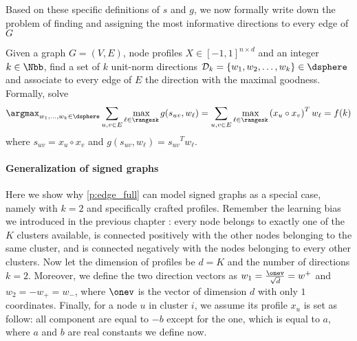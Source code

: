 Based on these specific definitions of $s$ and $g$, we now formally write down the problem of
finding and assigning the most informative directions to every edge of $G$
\begin{problem}[]
  \label{p:edge_full}
  Given a graph $G=(V, E)$, node profiles $X\in [-1, 1]^{n\times d}$ and an integer $k \in \Nbb$,
  find a set of $k$ unit-norm directions $\mathcal{D}_k = \{w_1, w_2, \ldots, w_k\} \in \dsphere$
  and associate to every edge of $E$ the direction with the maximal goodness. Formally, solve
  \begin{equation}
    \label{eq:edge_full}
    \argmax_{w_1,\ldots,w_k \in \dsphere}
    \sum_{u,v \in E} \max_{\ell \in \rangesk} g(s_{uv}, w_{\ell}) =
    \sum_{u,v \in E} \max_{\ell \in \rangesk} \left(x_u \circ x_v\right)^T w_{\ell} = f(k)
  \end{equation}
  where $s_{uv} = x_u \circ x_v$ and $g(s_{uv}, w_{\ell}) = {s_{uv}}^T w_{\ell}$.
\end{problem}


\paragraph{Generalization of signed graphs}
\label{par:generalization_of_signed_graphs}

Here we show why \autoref{p:edge_full} can model signed graphs as a special case, namely with $k=2$
and specifically crafted profiles.
Remember the learning
bias we introduced in the previous chapter : every node belongs to
exactly one of the $K$ clusters available, is connected positively with the other nodes belonging to
the same cluster, and is connected negatively with the nodes belonging to every other clusters. Now
let the dimension of profiles be $d=K$ and the number of directions $k=2$. Moreover, we define the
two direction vectors as $w_1 = \frac{\onev}{\sqrt{d}} = w^+$ and $w_2 = -w_+ = w_-$, where
$\onev$ is the vector of dimension $d$ with only $1$ coordinates. Finally, for a node $u$ in
cluster $i$, we assume its profile $x_u$ is set as follow: all component are equal to $-b$ except
for the \ith{} one, which is equal to $a$, where $a$ and $b$ are real constants we define now.

